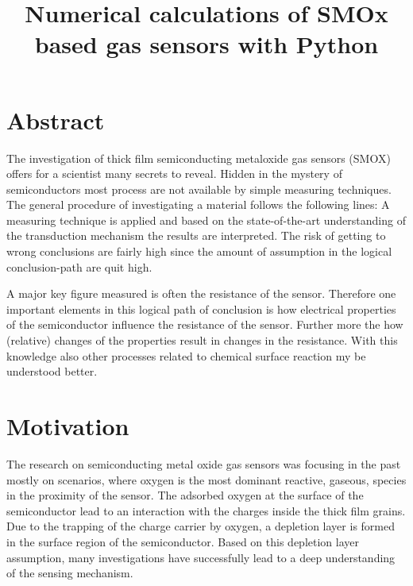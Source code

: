 \documentclass[11pt]{article}
\title{Numerical calculations of SMOx based gas sensors with Python}
\begin{document}
    
    \maketitle
    
    

    
    \tableofcontents 
\setcounter{section}{0}

    \hypertarget{abstract}{%
\section{Abstract}\label{abstract}}

The investigation of thick film semiconducting metaloxide gas sensors
(SMOX) offers for a scientist many secrets to reveal. Hidden in the
mystery of semiconductors most process are not available by simple
measuring techniques. The general procedure of investigating a material
follows the following lines: A measuring technique is applied and based
on the state-of-the-art understanding of the transduction mechanism the
results are interpreted. The risk of getting to wrong conclusions are
fairly high since the amount of assumption in the logical
conclusion-path are quit high.

A major key figure measured is often the resistance of the sensor.
Therefore one important elements in this logical path of conclusion is
how electrical properties of the semiconductor influence the resistance
of the sensor. Further more the how (relative) changes of the properties
result in changes in the resistance. With this knowledge also other
processes related to chemical surface reaction my be understood better.

    \hypertarget{motivation}{%
\section{Motivation}\label{motivation}}

The research on semiconducting metal oxide gas sensors was focusing in
the past mostly on scenarios, where oxygen is the most dominant
reactive, gaseous, species in the proximity of the sensor. The adsorbed
oxygen at the surface of the semiconductor lead to an interaction with
the charges inside the thick film grains. Due to the trapping of the
charge carrier by oxygen, a depletion layer is formed in the surface
region of the semiconductor. Based on this depletion layer assumption,
many investigations have successfully lead to a deep understanding of
the sensing mechanism.
\end{document}
